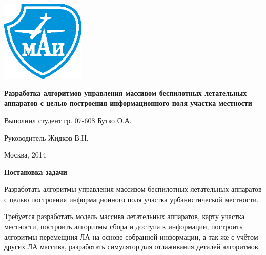 

\graphicspath{{pics/}}

\newenvironment{mintemize}%
{
    \vspace{-1.5em}
    \begin{itemize}
        \setlength\itemsep{-0.2em}
}
{
    \end{itemize}
    \vspace{-1em}
}

\newenvironment{cslide}
{
    \begin{slide}
    \begin{center}
}
{
    \end{center}
    \end{slide}
}



\begin{cslide}
    \includegraphics[width=4cm]{mai.eps}

    \textbf{ Разработка алгоритмов управления
    массивом беспилотных летательных аппаратов
    с целью построения информационного поля
    участка местности}

    \vspace{4em}

    \begin{flushright}
    \small Выполнил студент гр. 07-608 Бутко О.А.

    \small Руководитель Жидков В.Н.
    \end{flushright}

    \vspace{2em}

    \small Москва, 2014

\end{cslide}

\begin{slide}

    \makeatletter
    \let\@topfil\relax
    \makeatother

    \textbf{Постановка задачи}

    Разработать алгоритмы управления
    массивом беспилотных летательных аппаратов
    с целью построения информационного поля
    участка урбанистической местности.

    Требуется разработать модель массива летательных аппаратов,
    карту участка местности, построить алгоритмы сбора и доступа
    к информации, построить алгоритмы перемещния ЛА на основе собранной
    информации, а так же с учётом других ЛА массива,
    разработать симулятор для отлаживания деталей алгоритмов.
\end{slide}

